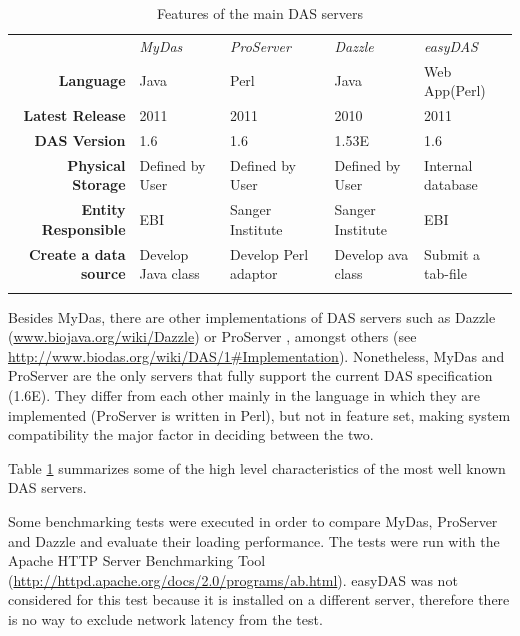 \begin{table}[t]
        \caption{Features of the main DAS servers}
        \label{tab:table1}
        \begin{tabular}{ r | l | l | l | l }
\rowcolor{table_header}
  & \emph{MyDas} & \emph{ProServer} & \emph{Dazzle} & \emph{easyDAS}\\
\rowcolor{row_odd}
\textbf{Language} & Java & Perl & Java & Web App(Perl)\\
\rowcolor{row_even}
\textbf{Latest Release} & 2011 & 2011 & 2010 & 2011\\
\rowcolor{row_odd}
\textbf{DAS Version} & 1.6 & 1.6 & 1.53E\footnotemark  & 1.6\\
\rowcolor{row_even}
\textbf{Physical Storage} & Defined by User & Defined by User & Defined by User & Internal database\\
\rowcolor{row_odd}
\textbf{Entity Responsible} & EBI & Sanger Institute & Sanger Institute & EBI\\
\rowcolor{row_even}
\textbf{Create a data source} & Develop Java class & Develop Perl adaptor & Develop ava class & Submit a tab-file\\
\rowcolor{row_odd}
        \end{tabular}
\end{table}

Besides MyDas, there are other implementations of DAS servers such as Dazzle (\url{www.biojava.org/wiki/Dazzle}) or ProServer \cite{FIN2007},  amongst others (see \url{http://www.biodas.org/wiki/DAS/1#Implementation}). Nonetheless, MyDas and ProServer are the only servers that fully support the current DAS specification (1.6E). They differ from each other mainly in the language in which they are implemented (ProServer is written in Perl), but not in feature set, making system compatibility the major factor in deciding between the two.

Table \ref{tab:table1} summarizes some of the high level characteristics of the most well known DAS servers.


Some benchmarking tests were executed in order to compare  MyDas, ProServer and Dazzle and evaluate their loading performance. The tests were run with the Apache HTTP Server Benchmarking Tool (\url{http://httpd.apache.org/docs/2.0/programs/ab.html}).  easyDAS was not considered for this test because it is installed on a different server, therefore there is no way to exclude network latency from the test.

